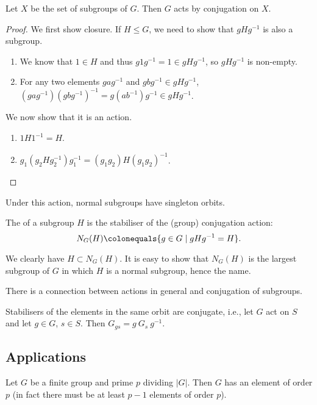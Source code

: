 \begin{lemma}
Let $X$ be the set of subgroups of $G$. Then $G$ acts by conjugation on $X$.
\end{lemma}

\begin{proof}
We first show closure. If $H\le G$, we need to show that $gHg^{-1}$ is also a subgroup.
\begin{enumerate}[label=(\roman*)]
\item We know that $1\in H$ and thus $g1g^{-1}=1\in gHg^{-1}$, so $gHg^{-1}$ is non-empty.
\item For any two elements $gag^{-1}$ and $gbg^{-1}\in gHg^{-1}$, $(gag^{-1})(gbg^{-1})^{-1}=g(ab^{-1})g^{-1}\in gHg^{-1}$.
\end{enumerate}

We now show that it is an action.
\begin{enumerate}[label=(\roman*)]
\item $1H1^{-1}=H$.
\item $g_1(g_2 Hg_2^{-1})g_1^{-1}=(g_1g_2)H(g_1g_2)^{-1}$.
\end{enumerate}
\end{proof}

Under this action, normal subgroups have singleton orbits.

\begin{definition}
The  of a subgroup $H$ is the stabiliser of the (group) conjugation action:
\[N_G(H)\colonequals\{g\in G\mid gHg^{-1}=H\}.\]
\end{definition}

We clearly have $H\subset N_G(H)$. It is easy to show that $N_G(H)$ is the largest subgroup of $G$ in which $H$ is a normal subgroup, hence the name.

There is a connection between actions in general and conjugation of subgroups.

\begin{lemma}
Stabilisers of the elements in the same orbit are conjugate, i.e., let $G$ act on $S$ and let $g\in G$, $s\in S$. Then $G_{gs}=g\:G_s\:g^{-1}$.
\end{lemma}

\subsection{Applications}
\begin{theorem}
Let $G$ be a finite group and prime $p$ dividing $|G|$. Then $G$ has an element of order $p$ (in fact there must be at least $p-1$ elements of order $p$).
\end{theorem}

